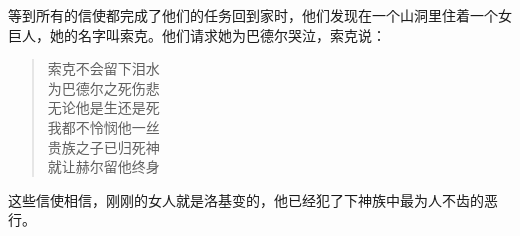 \begin{translation*}{}
    等到所有的信使都完成了他们的任务回到家时，他们发现在一个山洞里住着一个女巨人，她的名字叫索克。他们请求她为巴德尔哭泣，索克说：
    \begin{quote}
        索克不会留下泪水\\
        为巴德尔之死伤悲\\
        无论他是生还是死\\
        我都不怜悯他一丝\\
        贵族之子已归死神\\
        就让赫尔留他终身
    \end{quote}

    这些信使相信，刚刚的女人就是洛基变的，他已经犯了下神族中最为人不齿的恶行。
\end{translation*}
